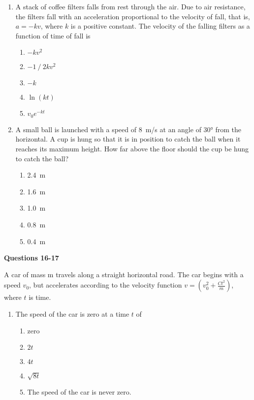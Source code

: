 \documentclass{../../../oss-apphys}
\begin{document}
\begin{multicols}{2}
\begin{enumerate}[resume,leftmargin=18pt]
  \item A stack of coffee filters falls from rest through the air. Due to air
    resistance, the filters fall with an acceleration proportional to the
    velocity of fall, that is, $a=-kv$, where $k$ is a positive constant. The
    velocity of the falling filters as a function of time of fall is
    \begin{enumerate}[noitemsep,topsep=0pt,leftmargin=18pt,label=(\Alph*)]
    \item $-kv^2$
    \item $-1⁄2kv^2$
    \item $-k$
    \item $\ln(kt)$
    \item $v_0e^{-kt}$
    \end{enumerate}
    
    \columnbreak
    
  \item A small ball is launched with a speed of \SI{8}{m/s} at an angle of
    \ang{30} from the horizontal. A cup is hung so that it is in position to
    catch the ball when it reaches its maximum height. How far above the floor
    should the cup be hung to catch the ball?
    

    \begin{enumerate}[noitemsep,topsep=0pt,leftmargin=18pt,label=(\Alph*)]
    \item\SI{2.4}{\metre}
    \item\SI{1.6}{\metre}
    \item\SI{1.0}{\metre}
    \item\SI{.8}{\metre}
    \item\SI{.4}{\metre}
    \end{enumerate}
  \end{enumerate}
  
  \textbf{Questions 16-17}

  A car of mass m travels along a straight horizontal road. The car begins with
  a speed $v_0$, but accelerates according to the velocity function
  $\displaystyle v=\left(v_0^2+\frac{Ct^2}{m}\right)$, where $t$ is time.

  \begin{enumerate}[resume,leftmargin=18pt]
  \item The speed of the car is zero at a time $t$ of
    \begin{enumerate}[noitemsep,topsep=0pt,leftmargin=18pt,label=(\Alph*)]
    \item zero
    \item $2t$
    \item $4t$
    \item $\sqrt{8t}$
    \item The speed of the car is never zero.
    \end{enumerate}
    

\end{enumerate}
\end{multicols}
\end{document}

